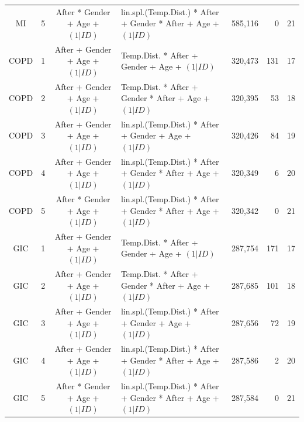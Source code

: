 \begin{landscape}
\begin{table}[htbp]
\begin{tabular}{ccclrrr}
    MI    & 5     & After * Gender + Age + $(1|ID)$ & lin.spl.(Temp.Dist.) * After + Gender * After + Age + $(1|ID)$ & 585,116 & 0     & 21 \\
    COPD  & 1     & After + Gender + Age + $(1|ID)$ & Temp.Dist. * After + Gender + Age + $(1|ID)$ & 320,473 & 131   & 17 \\
    COPD  & 2     & After + Gender + Age + $(1|ID)$ & Temp.Dist. * After + Gender * After + Age + $(1|ID)$ & 320,395 & 53    & 18 \\
    COPD  & 3     & After + Gender + Age + $(1|ID)$ & lin.spl.(Temp.Dist.) * After + Gender + Age + $(1|ID)$ & 320,426 & 84    & 19 \\
    COPD  & 4     & After + Gender + Age + $(1|ID)$ & lin.spl.(Temp.Dist.) * After + Gender * After + Age + $(1|ID)$ & 320,349 & 6     & 20 \\
    COPD  & 5     & After * Gender + Age + $(1|ID)$ & lin.spl.(Temp.Dist.) * After + Gender * After + Age + $(1|ID)$ & 320,342 & 0     & 21 \\
    GIC   & 1     & After + Gender + Age + $(1|ID)$ & Temp.Dist. * After + Gender + Age + $(1|ID)$ & 287,754 & 171   & 17 \\
    GIC   & 2     & After + Gender + Age + $(1|ID)$ & Temp.Dist. * After + Gender * After + Age + $(1|ID)$ & 287,685 & 101   & 18 \\
    GIC   & 3     & After + Gender + Age + $(1|ID)$ & lin.spl.(Temp.Dist.) * After + Gender + Age + $(1|ID)$ & 287,656 & 72    & 19 \\
    GIC   & 4     & After + Gender + Age + $(1|ID)$ & lin.spl.(Temp.Dist.) * After + Gender * After + Age + $(1|ID)$ & 287,586 & 2     & 20 \\
    GIC   & 5     & After * Gender + Age + $(1|ID)$ & lin.spl.(Temp.Dist.) * After + Gender * After + Age + $(1|ID)$ & 287,584 & 0     & 21 \\
    \bottomrule
    \bottomrule
    \end{tabular}%
\label{ch3:tabS1}
\end{table}%


\end{landscape}




